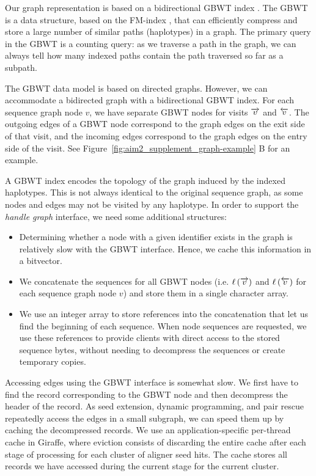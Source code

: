\documentclass[11pt]{ucscthesis}
\newcommand{\nodelabel}[1]{\ensuremath{\ell\left( #1 \right)}}
\newcommand{\forwardnode}[1]{\ensuremath{\protect\overrightarrow{ #1 }}}
\newcommand{\reversenode}[1]{\ensuremath{\protect\overleftarrow{ #1 }}}
\newcommand{\vocab}[1]{\emph{#1}}
\begin{document}
Our graph representation is based on a bidirectional GBWT index \cite{siren_indexes_2020}.
The GBWT is a data structure, based on the FM-index \cite{Ferragina2005a}, that can efficiently compress and store a large number of similar paths (haplotypes) in a graph.
The primary query in the GBWT is a counting query: as we traverse a path in the graph, we can always tell how many indexed paths contain the path traversed so far as a subpath.

The GBWT data model is based on directed graphs.
However, we can accommodate a bidirected graph with a bidirectional GBWT index.
For each sequence graph node $v$, we have separate GBWT nodes for visits $\forwardnode{v}$ and $\reversenode{v}$.
The outgoing edges of a GBWT node correspond to the graph edges on the exit side of that visit, and the incoming edges correspond to the graph edges on the entry side of the visit.
See Figure~\ref{fig:aim2_supplement_graph-example} B for an example.

A GBWT index encodes the topology of the graph induced by the indexed haplotypes.
This is not always identical to the original sequence graph, as some nodes and edges may not be visited by any haplotype.
In order to support the \vocab{handle graph} interface\cite{eizenga2020efficient}, we need some additional structures:
\begin{itemize}

\item Determining whether a node with a given identifier exists in the graph is relatively slow with the GBWT interface.
Hence, we cache this information in a bitvector.

\item We concatenate the sequences for all GBWT nodes (i.e. $\nodelabel{\forwardnode{v}}$ and $\nodelabel{\reversenode{v}}$ for each sequence graph node $v$) and store them in a single character array.

\item We use an integer array to store references into the concatenation that let us find the beginning of each sequence. When node sequences are requested, we use these references to provide clients with direct access to the stored sequence bytes, without needing to decompress the sequences or create temporary copies.

\end{itemize}

Accessing edges using the GBWT interface is somewhat slow.
We first have to find the record corresponding to the GBWT node and then decompress the header of the record.
As seed extension, dynamic programming, and pair rescue repeatedly access the edges in a small subgraph, we can speed them up by caching the decompressed records.
We use an application-specific per-thread cache in Giraffe, where eviction consists of discarding the entire cache after each stage of processing for each cluster of aligner seed hits. The cache stores all records we have accessed during the current stage for the current cluster.
\end{document}
